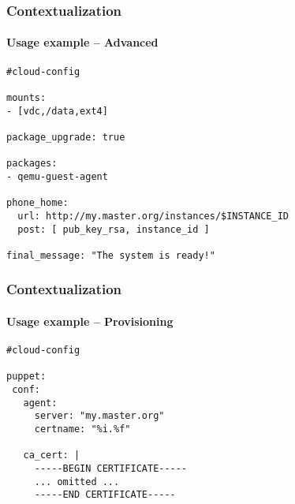 \begin{frame}[fragile]
  \frametitle{Contextualization}
  \framesubtitle{Usage example -- Advanced}

  \begin{lstlisting}
#cloud-config

mounts:
- [vdc,/data,ext4]

package_upgrade: true

packages:
- qemu-guest-agent

phone_home:
  url: http://my.master.org/instances/$INSTANCE_ID
  post: [ pub_key_rsa, instance_id ]

final_message: "The system is ready!"
  \end{lstlisting}
\end{frame}

\begin{frame}[fragile]
  \frametitle{Contextualization}
  \framesubtitle{Usage example -- Provisioning}

  \begin{lstlisting}
#cloud-config

puppet:
 conf:
   agent:
     server: "my.master.org"
     certname: "%i.%f"

   ca_cert: |
     -----BEGIN CERTIFICATE-----
     ... omitted ...
     -----END CERTIFICATE-----
  \end{lstlisting}
\end{frame}


